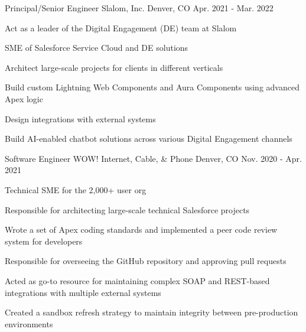 \begin{cventries}
  \cventry
    {Principal/Senior Engineer} %
    {Slalom, Inc.} %
    {Denver, CO} %
    {Apr. 2021 - Mar. 2022} %
    {
      \begin{cvitems} %
        \item {Act as a leader of the Digital Engagement (DE) team at Slalom}
        \item {SME of Salesforce Service Cloud and DE solutions}
        \item {Architect large-scale projects for clients in different verticals }
        \item {Build custom Lightning Web Components and Aura Components using advanced Apex logic}
        \item {Design integrations with external systems}
        \item {Build AI-enabled chatbot solutions across various Digital Engagement channels}
      \end{cvitems}
    }

  \cventry
    {Software Engineer} %
    {WOW! Internet, Cable, \& Phone} %
    {Denver, CO} %
    {Nov. 2020 - Apr. 2021} %
    {
      \begin{cvitems} %
        \item {Technical SME for the 2,000+ user org}
        \item {Responsible for architecting large-scale technical Salesforce projects}
        \item {Wrote a set of Apex coding standards and implemented a peer code review system for developers}
        \item {Responsible for overseeing the GitHub repository and approving pull requests}
        \item {Acted as go-to resource for maintaining complex SOAP and REST-based integrations with multiple external systems}
        \item {Created a sandbox refresh strategy to maintain integrity between pre-production environments}
      \end{cvitems}
    }


\end{cventries}
